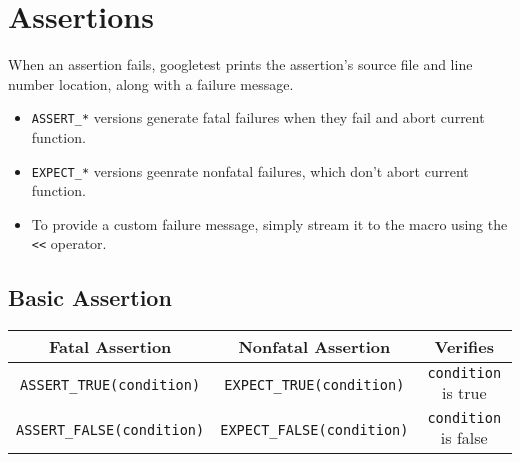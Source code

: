 \documentclass[letterpaper,11pt]{report}
\begin{document}
\section*{Assertions}
When an assertion fails, googletest prints the assertion's source file and line number location,
 along with a failure message.
\begin{itemize}
    \item \texttt{ASSERT\_*} versions generate fatal failures when they fail and abort current function.
    \item \texttt{EXPECT\_*} versions geenrate nonfatal failures, which don't abort current function.
    \item To provide a custom failure message, simply stream it to the macro using the \texttt{<<} operator.
\end{itemize}
\subsection*{Basic Assertion}
\begin{center}
    \begin{tabular}{| c | c | c |}
        \hline
        \textbf{Fatal Assertion}           & \textbf{Nonfatal Assertion}       & \textbf{Verifies}     \\ \hline 
        \texttt{ASSERT\_TRUE(condition)}   & \texttt{EXPECT\_TRUE(condition)}  & \texttt{condition} is true \\ \hline
        \texttt{ASSERT\_FALSE(condition)}  & \texttt{EXPECT\_FALSE(condition)} & \texttt{condition} is false \\ \hline
    \end{tabular}
\end{center}
\end{document}
